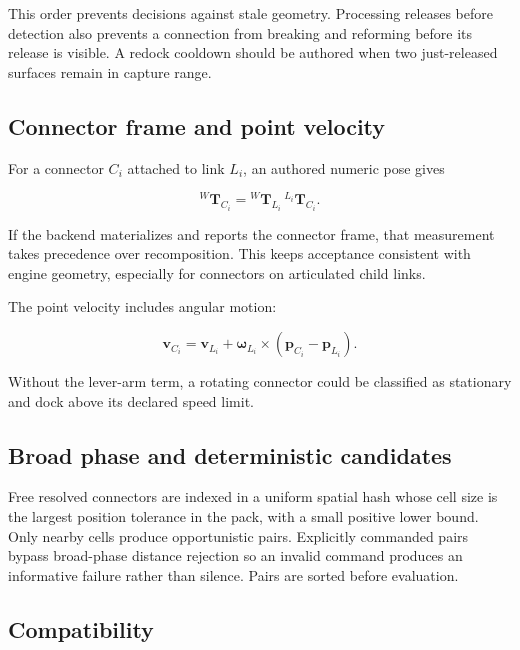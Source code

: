 This order prevents decisions against stale geometry. Processing releases before
detection also prevents a connection from breaking and reforming before its release is
visible. A redock cooldown should be authored when two just-released surfaces remain in
capture range.

\subsection{Connector frame and point velocity}

For a connector $C_i$ attached to link $L_i$, an authored numeric pose gives

\begin{equation}
{}^{W}\mathbf T_{C_i} =
{}^{W}\mathbf T_{L_i}\,{}^{L_i}\mathbf T_{C_i}.
\label{eq:connector-transform}
\end{equation}

If the backend materializes and reports the connector frame, that measurement takes
precedence over recomposition. This keeps acceptance consistent with engine geometry,
especially for connectors on articulated child links.

The point velocity includes angular motion:

\begin{equation}
\mathbf v_{C_i} = \mathbf v_{L_i} +
\boldsymbol\omega_{L_i}\times(\mathbf p_{C_i}-\mathbf p_{L_i}).
\label{eq:connector-velocity}
\end{equation}

Without the lever-arm term, a rotating connector could be classified as stationary and
dock above its declared speed limit.

\subsection{Broad phase and deterministic candidates}

Free resolved connectors are indexed in a uniform spatial hash whose cell size is the
largest position tolerance in the pack, with a small positive lower bound. Only nearby
cells produce opportunistic pairs. Explicitly commanded pairs bypass broad-phase
distance rejection so an invalid command produces an informative failure rather than
silence. Pairs are sorted before evaluation.

\subsection{Compatibility}

